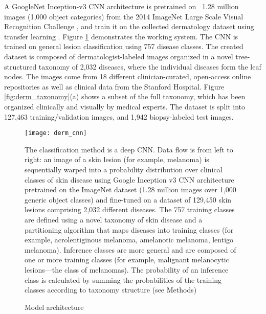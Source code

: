 A GoogleNet Inception-v3 CNN architecture \cite{szegedy2016rethinking} is pretrained on ~1.28 million images (1,000 object categories) from the 2014 ImageNet Large Scale Visual Recognition Challenge \cite{russakovsky2015imagenet}, and train it on the collected dermatology dataset using transfer learning \cite{pan2009survey}. Figure \ref{fig:derm_cnn} demonstrates the working system. The CNN is trained on general lesion classification using 757 disease classes. The created dataset is composed of dermatologist-labeled images organized in a novel tree-structured taxonomy of 2,032 diseases, where the individual diseases form the leaf nodes. The images come from 18 different clinician-curated, open-access online repositories as well as clinical data from the Stanford Hospital. Figure \ref{fig:derm_taxonomy}(a) shows a subset of the full taxonomy, which has been organized clinically and visually by medical experts. The dataset is split into 127,463 training/validation images, and 1,942 biopsy-labeled test images.

\begin{figure}
\texttt{[image: derm\_cnn]}
\caption{Model architecture}
\vspace{12px}
The classification method is a deep CNN. Data flow is from left to right: an image of a skin lesion (for example, melanoma) is sequentially warped into a probability distribution over clinical classes of skin disease using Google Inception v3 CNN architecture pretrained on the ImageNet dataset (1.28 million images over 1,000 generic object classes) and fine-tuned on a dataset of 129,450 skin lesions comprising 2,032 different diseases. The 757 training classes are defined using a novel taxonomy of skin disease and a partitioning algorithm that maps diseases into training classes (for example, acrolentiginous melanoma, amelanotic melanoma, lentigo melanoma). Inference classes are more general and are composed of one or more training classes (for example, malignant melanocytic lesions—the class of melanomas). The probability of an inference class is calculated by summing the probabilities of the training classes according to taxonomy structure (see Methods)
\label{fig:derm_cnn}
\end{figure}

